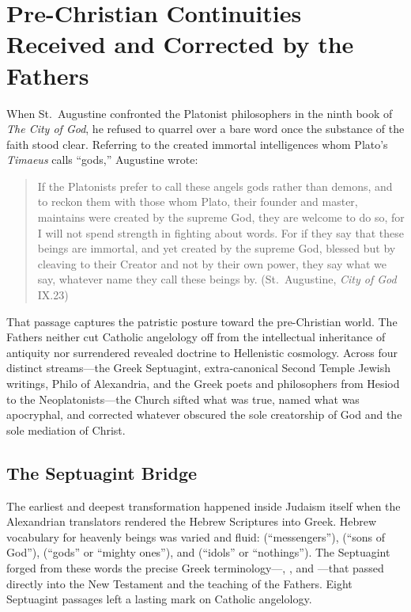 \section{Pre-Christian Continuities Received and Corrected by the Fathers}
\label{sec:pre-christian-continuities}

When St.~Augustine confronted the Platonist philosophers in the ninth book of \emph{The City of God}, he refused to quarrel over a bare word once the substance of the faith stood clear. Referring to the created immortal intelligences whom Plato's \emph{Timaeus} calls ``gods,'' Augustine wrote:
\begin{quotation}
If the Platonists prefer to call these angels gods rather than demons, and to reckon them with those whom Plato, their founder and master, maintains were created by the supreme God, they are welcome to do so, for I will not spend strength in fighting about words. For if they say that these beings are immortal, and yet created by the supreme God, blessed but by cleaving to their Creator and not by their own power, they say what we say, whatever name they call these beings by. (St.~Augustine, \emph{City of God} IX.23)
\end{quotation}
That passage captures the patristic posture toward the pre-Christian world. The Fathers neither cut Catholic angelology off from the intellectual inheritance of antiquity nor surrendered revealed doctrine to Hellenistic cosmology. Across four distinct streams---the Greek Septuagint, extra-canonical Second Temple Jewish writings, Philo of Alexandria, and the Greek poets and philosophers from Hesiod to the Neoplatonists---the Church sifted what was true, named what was apocryphal, and corrected whatever obscured the sole creatorship of God and the sole mediation of Christ.

\subsection{The Septuagint Bridge}
\label{subsec:lxx-bridge}

The earliest and deepest transformation happened inside Judaism itself when the Alexandrian translators rendered the Hebrew Scriptures into Greek. Hebrew vocabulary for heavenly beings was varied and fluid:  (``messengers''),  (``sons of God''),  (``gods'' or ``mighty ones''), and  (``idols'' or ``nothings''). The Septuagint forged from these words the precise Greek terminology---, , and ---that passed directly into the New Testament and the teaching of the Fathers. Eight Septuagint passages left a lasting mark on Catholic angelology.

